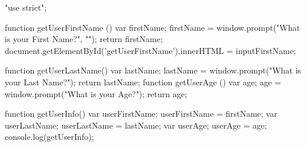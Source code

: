 "use strict";

function getUserFirstName () {
	var firstName;
	firstName = window.prompt("What is your First Name?", "");
	return firstName;
	document.getElementById('getUserFirstName').innerHTML = inputFirstName;
}

function getUserLastName() {
	var lastName;
	lastName = window.prompt("What is your Last Name?");
	return lastName;
}
function getUserAge () {
	var age;
	age = window.prompt("What is your Age?");
	return age;
}

function getUserInfo() {
	var userFirstName;
	userFirstName = firstName;
	var userLastName;
	userLastName = lastName;
	var userAge;
	userAge = age;
}
console.log(getUserInfo);
